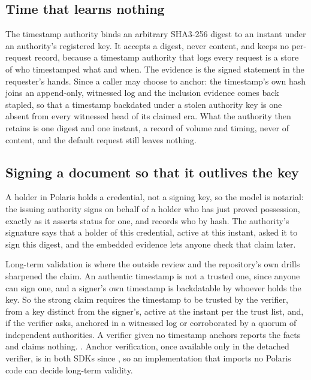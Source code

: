 \subsection{Time that learns nothing}

The timestamp authority binds an arbitrary SHA3-256 digest to an instant under an authority's
registered key. It accepts a digest, never content, and keeps no per-request record, because a
timestamp authority that logs every request is a store of who timestamped what and when. The
evidence is the signed statement in the requester's hands. Since  a caller may choose
to anchor: the timestamp's own hash joins an append-only, witnessed log and the inclusion evidence
comes back stapled, so that a timestamp backdated under a stolen authority key is one absent from
every witnessed head of its claimed era. What the authority then retains is one digest and one
instant, a record of volume and timing, never of content, and the default request still leaves
nothing. \sImpl

\subsection{Signing a document so that it outlives the key}

A holder in Polaris holds a credential, not a signing key, so the model is notarial: the issuing
authority signs on behalf of a holder who has just proved possession, exactly as it asserts status
for one, and records who by hash. The authority's signature says that a holder of this credential,
active at this instant, asked it to sign this digest, and the embedded evidence lets anyone check
that claim later. \sImpl

Long-term validation is where the outside review and the repository's own drills sharpened the
claim. An authentic timestamp is not a trusted one, since anyone can sign one, and a signer's own
timestamp is backdatable by whoever holds the key. So the strong claim requires the timestamp to be
trusted by the verifier, from a key distinct from the signer's, active at the instant per the trust
list, and, if the verifier asks, anchored in a witnessed log or corroborated by a quorum of
independent authorities. A verifier given no timestamp anchors reports the facts and claims nothing.
\sImpl. Anchor verification, once available only in the detached verifier, is in both SDKs since
, so an implementation that imports no Polaris code can decide long-term validity.

